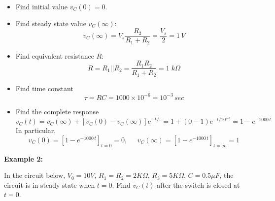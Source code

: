 \documentclass{article}
\begin{document}


\begin{itemize}
\item Find initial value $v_C(0)=0$. 

\item Find steady state value $v_C(\infty)$:
  \begin{equation}	
    v_C(\infty)=V_s\frac{R_2}{R_1+R_2}=\frac{V_s}{2} =1\,V
  \end{equation}
\item Find equivalent resistance $R$:
  \begin{equation}
    R=R_1 || R_2=\frac{R_1 R_2}{R_1+R_2}=1\;k\Omega	
  \end{equation}
\item Find time constant 
  \begin{equation}
    \tau=RC=1000\times 10^{-6}= 10^{-3}\,sec     
  \end{equation}
\item Find the complete response
  \begin{equation}
    v_C(t)=v_C(\infty)+[v_C(0)-v_C(\infty)]e^{-t/\tau}
    =1+(0-1)e^{-t/10^{-3}}=1-e^{-1000\,t}
  \end{equation}
  In particular,
  \begin{equation}
    v_C(0)=\left[1-e^{-1000\,t}\right]_{t=0}=0,\;\;\;\;\;
    v_C(\infty)=\left[1-e^{-1000\,t}\right]_{t=\infty}=1
  \end{equation}
\end{itemize}

{\bf Example 2:}

In the circuit below, $V_0=10V$, $R_1=R_2=2K\Omega$, $R_3=5K\Omega$, 
$C=0.5\mu F$, the circuit is in steady state when $t=0$. Find $v_C(t)$
after the switch is closed at $t=0$.

\end{document}
